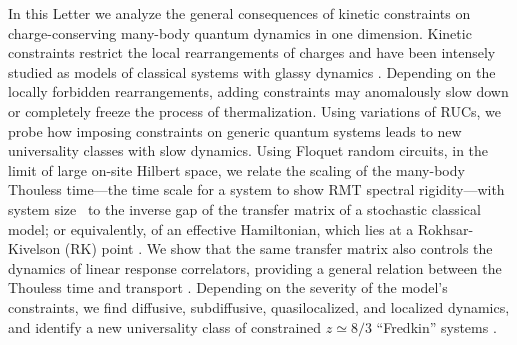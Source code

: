 \documentclass[prl,aps,amsfonts,twocolumn,superscriptaddress,notitlepage,floatfix]{revtex4-1}
\begin{document}
In this Letter we analyze the general consequences of kinetic constraints on charge-conserving many-body quantum dynamics in one dimension. Kinetic constraints restrict the local rearrangements of charges and have been intensely studied as models of classical systems with glassy dynamics \cite{Valado_2016,QuantumEast2020,Scherg_2021,Lan_2018,Everest_2016,garrahan2010kinetically,GarrahanLectures,RitortKCM,KCMRydberg}. Depending on the %
locally forbidden rearrangements, adding constraints may anomalously slow down or completely freeze the process of thermalization. Using variations of RUCs, we probe how imposing constraints on generic quantum systems leads to new universality classes with slow dynamics. Using Floquet random circuits, in the limit of large on-site Hilbert space, we relate the scaling of the many-body Thouless time---the time scale for a system to show RMT spectral rigidity---with system size~\cite{CDLC1,CDLC2,bertini2018exact,ShenkerRMT,ShenkerRMT,FyodorovMirlin,CiracRUFC,U1FRUC,SwingleSFFHydro,SwingleSFFSSB,Kos_2021} to the inverse gap of the transfer matrix of a stochastic classical model; or equivalently, of an effective Hamiltonian, which lies at a Rokhsar-Kivelson (RK) point \cite{RK,SanjayAmosFracton,U1FRUC}. We show that the same %
transfer matrix also controls the dynamics of linear response correlators, providing a general relation between the Thouless time and transport \cite{ShenkerRMT}. Depending on the severity of the model's constraints, we find %
diffusive, subdiffusive, quasilocalized, and localized dynamics, and identify a new universality class of constrained $z \simeq 8/3$ ``Fredkin'' systems \cite{FredkinEntanglement,Korepin2016fredkin,Korepin2017fredkin,ChenFredkin2017,ChenFredkin2017a,Zhang2017fredkin,Udagawa2017fredkin,FredkinFragmentScar,ChenFredkin2020}%
.
\end{document}
